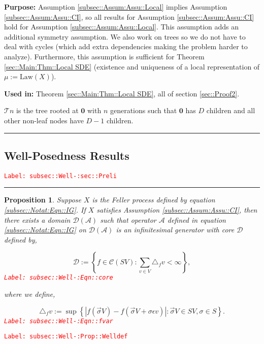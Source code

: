 \documentclass[12pt]{article}
\newcommand{\mc}{\mathcal}
\newcommand{\te}{\text}
\newcommand{\ep}{\epsilon}
\newcommand{\tr}{\textcolor{red}}
\newcommand{\labe}[1]{\tr{\texttt{Label: #1}}}
\newcommand{\purpose}{\textbf{Purpose: }}
\newcommand{\usein}{\textbf{Used in: }}
\newcommand{\ind}{\hspace{24pt}}
\newcommand{\lin}{\rule{\linewidth}{0.4 pt}}
\newcommand{\defeq}{:=}								%
\renewcommand{\root}{\mathbf{0}}				%
\renewcommand{\v}{v}							%
\renewcommand{\S}{S}							%
\newcommand{\s}{\sigma}							%
\newcommand{\sv}{\vec{\s}}						%
\newcommand{\ev}{\ep}							%
\newcommand{\X}{X}								%
\newcommand{\IG}{\mc{A}}						%
\newcommand{\f}{f}								%
\newcommand{\degr}{D}							%
\newcommand{\tree}{\mc{T}}						%
\newcommand{\core}{\mc{D}}						%
\newcommand{\cont}{\mc{C}}						%
\newcommand{\delt}{\triangle}					%
\newcommand{\deltf}[1]{_{#1}}					%
\newcommand{\m}{\mu}							%
\newcommand{\law}{\te{Law}}						%
\newtheorem{prop}[thms]{Proposition}
\begin{document}
\purpose Assumption \ref{subsec::Assum:Assu::Local} implies Assumption \ref{subsec::Assum:Assu::CI}, so all results for Assumption \ref{subsec::Assum:Assu::CI} hold for Assumption \ref{subsec::Assum:Assu::Local}. This assumption adds an additional symmetry assumption. We also work on trees so we do not have to deal with cycles (which add extra dependencies making the problem harder to analyze). Furthermore, this assumption is sufficient for Theorem \ref{sec::Main:Thm::Local SDE} (existence and uniqueness of a local representation of \(\m{}{}{} \defeq \law(\X{}{})\)).

\usein Theorem \ref{sec::Main:Thm::Local SDE}, all of section \ref{sec::Proof2}.

\ind \(\tree{n}\) is the tree rooted at \(\root\) with \(n\) generations such that \(\root\) has \(\degr\) children and all other non-leaf nodes have \(\degr-1\) children.

\lin

\subsection{Well-Posedness Results}
\label{subsec::Well-:sec::Preli}\labe{subsec::Well-:sec::Preli}

\rule{\linewidth}{0.4 pt}

\begin{prop}
Suppose \(\X{}{}\) is the Feller process defined by equation \eqref{subsec::Notat:Eqn::IG}. If \(\X{}{}\) satisfies Assumption \ref{subsec::Assum:Assu::CI}, then there exists a domain \(\core(\IG)\) such that operator \(\IG\) defined in equation \eqref{subsec::Notat:Eqn::IG} on \(\mc{D}(\IG)\) is an infinitesimal generator with core \(\core\) defined by,

\begin{equation}
\core \defeq \left\{f \in \cont(\S{V}): \sum_{\v\in V} \delt\deltf{\f}{\v} < \infty\right\},
\label{subsec::Well-:Eqn::core}
\end{equation}
\labe{subsec::Well-:Eqn::core}

where we define,

\begin{equation}
\delt\deltf{\f}{\v} \defeq \sup\left\{|f(\sv{}{V}) - f(\sv{}{V}+\s\ev{\v})|: \sv{}{V} \in \S{V},\s \in \S\right\}.
\label{subsec::Well-:Eqn::fvar}
\end{equation}
\labe{subsec::Well-:Eqn::fvar}

\label{subsec::Well-:Prop::Welldef}
\end{prop}
\labe{subsec::Well-:Prop::Welldef}
\end{document}
